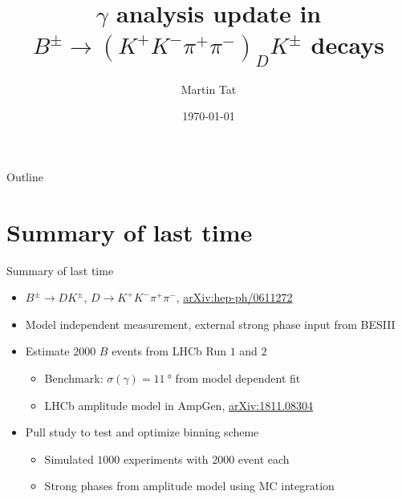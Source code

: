 \documentclass{beamer}
\title[$B^\pm\to(K^+K^-\pi^+\pi^-)_DK^\pm$]{\texorpdfstring{$\gamma$}{gamma} analysis update in \texorpdfstring{$B^\pm\to(K^+K^-\pi^+\pi^-)_DK^\pm$}{B to K+K-pi+pi-} decays}
\author{Martin Tat}
\institute{Oxford LHCb}
\date{\today}
\begin{document}
\begin{frame}
  \titlepage
\end{frame}

\begin{frame}{Outline}
  \tableofcontents
\end{frame}

\section{Summary of last time}
\begin{frame}{Summary of last time}
  \begin{itemize}
    \setlength\itemsep{1.2em}
    \item{$B^\pm\to DK^\pm$, $D\to K^+K^-\pi^+\pi^-$, \href{https://arxiv.org/abs/hep-ph/0611272}{arXiv:hep-ph/0611272}}
    \item{Model independent measurement, external strong phase input from BESIII}
    \item{Estimate $2000$ $B$ events from LHCb Run $1$ and $2$}
    \begin{itemize}
      \item{Benchmark: $\sigma(\gamma) = \SI{11}{\degree}$ from model dependent fit}
      \item{LHCb amplitude model in AmpGen, \href{https://arxiv.org/abs/1811.08304}{arXiv:1811.08304}}
    \end{itemize}
    \item{Pull study to test and optimize binning scheme}
    \begin{itemize}
      \item{Simulated $1000$ experiments with $2000$ event each}
      \item{Strong phases from amplitude model using MC integration}
    \end{itemize}
  \end{itemize}
\end{frame}
\end{document}
